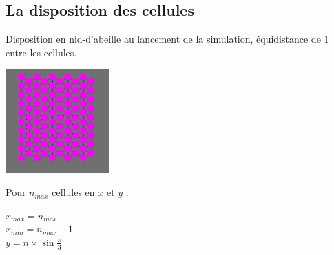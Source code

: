\documentclass{beamer}
\begin{document}
\subsection{La disposition des cellules}
\begin{frame}
  Disposition en nid-d'abeille au lancement de la simulation, équidistance de 1 entre les cellules.
  \begin{center}
    \includegraphics[width=4cm]{Images/hexagone.png}
  \end{center}
  Pour $n_{max}$ cellules en $x$ et $y$ : \\
  \begin{center}
    $x_{max} = n_{max}$ \\
    $x_{min} = n_{max} - 1$ \\
    $y = n \times \sin{\frac{\pi}{3}}$
  \end{center}
\end{frame}
\end{document}
